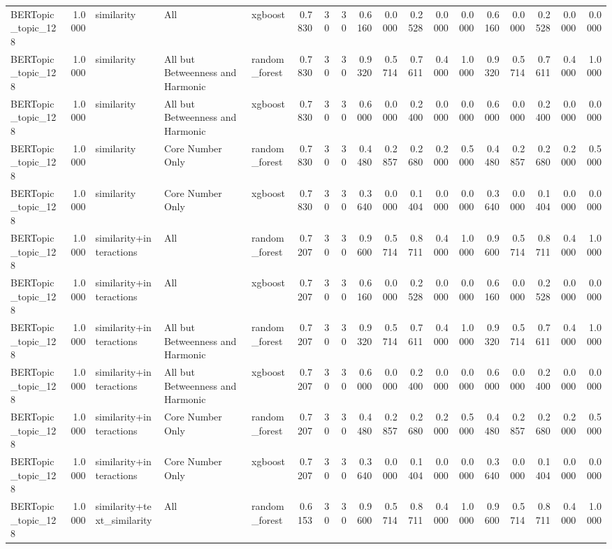\begin{tabular}{lrlllrrrrrrrrrrrrr}
BERTopic_topic_128 & 1.0000 & similarity & All & xgboost & 0.7830 & 30 & 30 & 0.6160 & 0.0000 & 0.2528 & 0.0000 & 0.0000 & 0.6160 & 0.0000 & 0.2528 & 0.0000 & 0.0000 \\
BERTopic_topic_128 & 1.0000 & similarity & All but Betweenness and Harmonic & random_forest & 0.7830 & 30 & 30 & 0.9320 & 0.5714 & 0.7611 & 0.4000 & 1.0000 & 0.9320 & 0.5714 & 0.7611 & 0.4000 & 1.0000 \\
BERTopic_topic_128 & 1.0000 & similarity & All but Betweenness and Harmonic & xgboost & 0.7830 & 30 & 30 & 0.6000 & 0.0000 & 0.2400 & 0.0000 & 0.0000 & 0.6000 & 0.0000 & 0.2400 & 0.0000 & 0.0000 \\
BERTopic_topic_128 & 1.0000 & similarity & Core Number Only & random_forest & 0.7830 & 30 & 30 & 0.4480 & 0.2857 & 0.2680 & 0.2000 & 0.5000 & 0.4480 & 0.2857 & 0.2680 & 0.2000 & 0.5000 \\
BERTopic_topic_128 & 1.0000 & similarity & Core Number Only & xgboost & 0.7830 & 30 & 30 & 0.3640 & 0.0000 & 0.1404 & 0.0000 & 0.0000 & 0.3640 & 0.0000 & 0.1404 & 0.0000 & 0.0000 \\
BERTopic_topic_128 & 1.0000 & similarity+interactions & All & random_forest & 0.7207 & 30 & 30 & 0.9600 & 0.5714 & 0.8711 & 0.4000 & 1.0000 & 0.9600 & 0.5714 & 0.8711 & 0.4000 & 1.0000 \\
BERTopic_topic_128 & 1.0000 & similarity+interactions & All & xgboost & 0.7207 & 30 & 30 & 0.6160 & 0.0000 & 0.2528 & 0.0000 & 0.0000 & 0.6160 & 0.0000 & 0.2528 & 0.0000 & 0.0000 \\
BERTopic_topic_128 & 1.0000 & similarity+interactions & All but Betweenness and Harmonic & random_forest & 0.7207 & 30 & 30 & 0.9320 & 0.5714 & 0.7611 & 0.4000 & 1.0000 & 0.9320 & 0.5714 & 0.7611 & 0.4000 & 1.0000 \\
BERTopic_topic_128 & 1.0000 & similarity+interactions & All but Betweenness and Harmonic & xgboost & 0.7207 & 30 & 30 & 0.6000 & 0.0000 & 0.2400 & 0.0000 & 0.0000 & 0.6000 & 0.0000 & 0.2400 & 0.0000 & 0.0000 \\
BERTopic_topic_128 & 1.0000 & similarity+interactions & Core Number Only & random_forest & 0.7207 & 30 & 30 & 0.4480 & 0.2857 & 0.2680 & 0.2000 & 0.5000 & 0.4480 & 0.2857 & 0.2680 & 0.2000 & 0.5000 \\
BERTopic_topic_128 & 1.0000 & similarity+interactions & Core Number Only & xgboost & 0.7207 & 30 & 30 & 0.3640 & 0.0000 & 0.1404 & 0.0000 & 0.0000 & 0.3640 & 0.0000 & 0.1404 & 0.0000 & 0.0000 \\
BERTopic_topic_128 & 1.0000 & similarity+text_similarity & All & random_forest & 0.6153 & 30 & 30 & 0.9600 & 0.5714 & 0.8711 & 0.4000 & 1.0000 & 0.9600 & 0.5714 & 0.8711 & 0.4000 & 1.0000 \\

\end{tabular}
